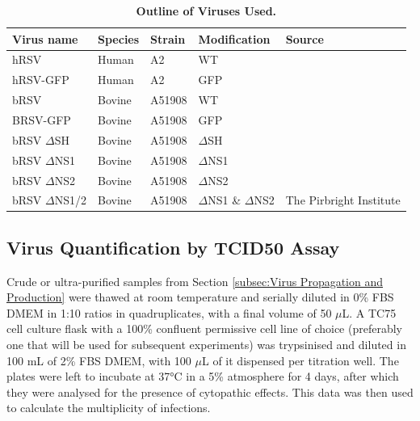 \begin{table}
\centering
\begin{tabular}{lllll}
\toprule
{\textbf{Virus name}} &
  {\textbf{Species}} &
  { \textbf{Strain}} &
  { \textbf{Modification}} &
  { \textbf{Source}} \\ \midrule
hRSV      & Human  & A2     & WT   &  \\ 
hRSV-GFP  & Human  & A2     & GFP  &  \\ 
bRSV      & Bovine & A51908 & WT   &  \\ 
BRSV-GFP  & Bovine & A51908 & GFP  &  \\ 
bRSV \(\Delta\)SH  & Bovine & A51908 & \(\Delta\)SH  &  \\ 
bRSV \(\Delta\)NS1 & Bovine & A51908 & \(\Delta\)NS1 &  \\ 
bRSV \(\Delta\)NS2 & Bovine & A51908 & \(\Delta\)NS2 &  \\ 
bRSV \(\Delta\)NS1/2 &
  Bovine &
  A51908 &
  \(\Delta\)NS1 \& \(\Delta\)NS2 &
  \multirow{-8}{*}{The Pirbright Institute} \\ \bottomrule
\end{tabular}
\caption[Outline of Viruses Used.]{\textbf{Outline of Viruses Used.}}
\label{tab:Outline of Viruses Used table}
\end{table}

\subsection{Virus Quantification by TCID50 Assay} \label{subsec:Virus Quantification by TCID50 Assay}
Crude or ultra-purified samples from Section \ref{subsec:Virus Propagation and Production} were thawed at room temperature and serially diluted in 0\% FBS DMEM in 1:10 ratios in quadruplicates, with a final volume of 50 $\mu$L. A TC75 cell culture flask with a 100\% confluent permissive cell line of choice (preferably one that will be used for subsequent experiments) was trypsinised and diluted in 100 mL of 2\% FBS DMEM, with 100 $\mu$L of it dispensed per titration well. The plates were left to incubate at 37°C in a 5\%  atmosphere for 4 days, after which they were analysed for the presence of cytopathic effects. This data was then used to calculate the multiplicity of infections.

